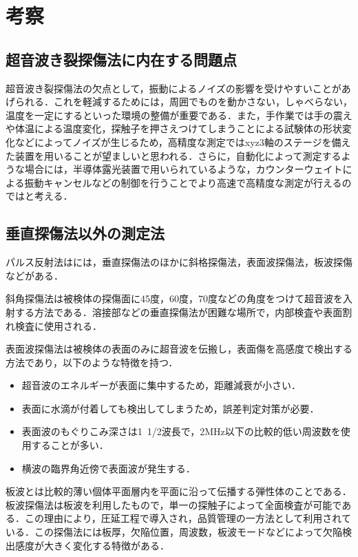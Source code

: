 \section{考察}

\subsection{超音波き裂探傷法に内在する問題点}
超音波き裂探傷法の欠点として，振動によるノイズの影響を受けやすいことがあげられる．これを軽減するためには，周囲でものを動かさない，しゃべらない，温度を一定にするといった環境の整備が重要である．また，手作業では手の震えや体温による温度変化，探触子を押さえつけてしまうことによる試験体の形状変化などによってノイズが生じるため，高精度な測定ではxyz3軸のステージを備えた装置を用いることが望ましいと思われる．さらに，自動化によって測定するような場合には，半導体露光装置で用いられているような，カウンターウェイトによる振動キャンセルなどの制御を行うことでより高速で高精度な測定が行えるのではと考える．

\subsection{垂直探傷法以外の測定法}
パルス反射法はには，垂直探傷法のほかに斜格探傷法，表面波探傷法，板波探傷などがある．

斜角探傷法は被検体の探傷面に45度，60度，70度などの角度をつけて超音波を入射する方法である．溶接部などの垂直探傷法が困難な場所で，内部検査や表面割れ検査に使用される．

表面波探傷法は被検体の表面のみに超音波を伝搬し，表面傷を高感度で検出する方法であり，以下のような特徴を持つ．
\begin{itemize}
    \item 超音波のエネルギーが表面に集中するため，距離減衰が小さい．
    \item 表面に水滴が付着しても検出してしまうため，誤差判定対策が必要．
    \item 表面波のもぐりこみ深さは1~1/2波長で，2MHz以下の比較的低い周波数を使用することが多い．
    \item 横波の臨界角近傍で表面波が発生する．
\end{itemize}

板波とは比較的薄い個体平面層内を平面に沿って伝播する弾性体のことである．板波探傷法は板波を利用したもので，単一の探触子によって全面検査が可能である．この理由により，圧延工程で導入され，品質管理の一方法として利用されている．この探傷法には板厚，欠陥位置，周波数，板波モードなどによって欠陥検出感度が大きく変化する特徴がある．
